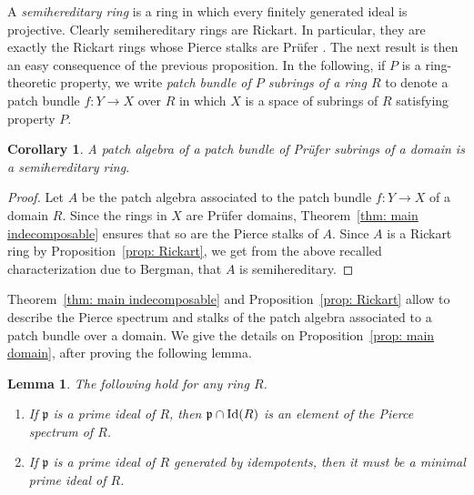 \documentclass[11pt]{amsart}
\newtheorem{lemma}[theorem]{Lemma}
\newtheorem{corollary}[theorem]{Corollary}
\theoremstyle{definition}
\def\Id{\mbox{\rm Id}}
\begin{document}
A {\it semihereditary ring} is a ring in which every finitely generated ideal is projective. Clearly semihereditary rings are Rickart. In particular, they are exactly the Rickart rings whose Pierce stalks are Pr\"ufer \cite[Theorem 4.1]{Bergman}. The next result is then an easy consequence of the previous proposition. In the following, if $P$ is a ring-theoretic  property, we write {\it patch bundle of $P$ subrings of a ring $R$} to denote a patch bundle $f: Y\rightarrow X$ over $R$ in which $X$ is a space of subrings of $R$ satisfying property $P$.

\begin{corollary}\label{cor: semihereditary}
A patch algebra of a patch bundle of Pr\"ufer subrings of a domain is a semihereditary ring. 
\end{corollary}

\begin{proof}
 Let $A$ be the patch algebra associated to the patch bundle $f:Y \rightarrow X$ of a domain $R$. Since the rings in $X$ are Pr\"ufer domains, Theorem~\ref{thm: main indecomposable} ensures that so are the Pierce stalks of $A$. Since $A$ is a Rickart ring by Proposition~\ref{prop: Rickart}, we get from the above recalled characterization \cite[Theorem 4.1]{Bergman} due to Bergman, that $A$ is semihereditary.
\end{proof}

 Theorem~\ref{thm: main indecomposable} and Proposition~\ref{prop: Rickart} allow to describe the Pierce spectrum and stalks of the patch algebra associated to a patch bundle over a domain. We give the details on Proposition~\ref{prop: main domain}, after proving the following lemma. 

\begin{lemma}\label{lem: (minimal) primes}
   The following hold for any ring $R$.
\begin{enumerate}[label=\textup{(\roman{*})}, mode=unboxed]
    \item\label{lem: (minimal) primes i} If $\mathfrak p$ is a prime ideal of $R$, then $\mathfrak p \cap \Id(R)$ is an element of the Pierce spectrum of $R$.
    \item\label{lem: (minimal) primes ii}  If $\mathfrak p$ is a prime ideal of $R$ generated by idempotents, then it must be a minimal prime ideal of $R$.
\end{enumerate}
\end{lemma}
\end{document}
